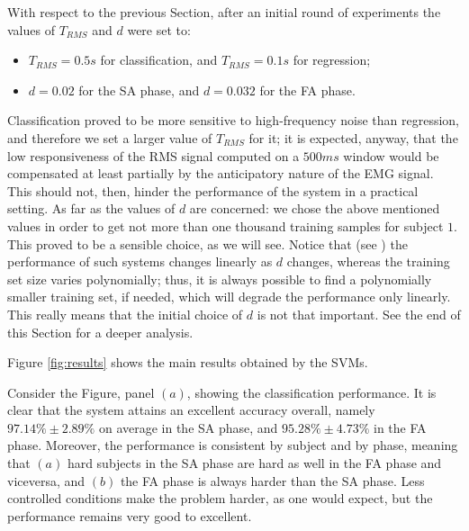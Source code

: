 \documentclass[10pt]{bmc_article}
\def\texttt{[image: ]}
\newenvironment{bmcformat}{\begin{raggedright}\baselineskip20pt\sloppy\setboolean{publ}{false}}{\end{raggedright}\baselineskip20pt\sloppy}
\begin{document}
\begin{bmcformat}
With respect to the previous Section, after an initial round of
experiments the values of $T_{RMS}$ and $d$ were set to:

\begin{itemize}

  \item $T_{RMS}=0.5s$ for classification, and $T_{RMS}=0.1s$ for regression;

  \item $d=0.02$ for the SA phase, and $d=0.032$ for the FA phase.

\end{itemize}

Classification proved to be more sensitive to high-frequency noise
than regression, and therefore we set a larger value of $T_{RMS}$ for
it; it is expected, anyway, that the low responsiveness of the RMS
signal computed on a $500ms$ window would be compensated at least
partially by the anticipatory nature of the EMG signal. This should
not, then, hinder the performance of the system in a practical
setting. As far as the values of $d$ are concerned: we chose the above
mentioned values in order to get not more than one thousand training
samples for subject $1$.  This proved to be a sensible choice, as we
will see. Notice that (see \cite{2008.BioCyb}) the performance of such
systems changes linearly as $d$ changes, whereas the training set size
varies polynomially; thus, it is always possible to find a
polynomially smaller training set, if needed, which will degrade the
performance only linearly. This really means that the initial choice
of $d$ is not that important. See the end of this Section for a deeper
analysis.

Figure \ref{fig:results} shows the main results obtained by the SVMs.


Consider the Figure, panel $(a)$, showing the classification
performance. It is clear that the system attains an excellent accuracy
overall, namely $97.14\% \pm 2.89\%$ on average in the SA phase, and
$95.28\% \pm 4.73\%$ in the FA phase. Moreover, the performance is
consistent by subject and by phase, meaning that $(a)$ hard subjects
in the SA phase are hard as well in the FA phase and viceversa, and
$(b)$ the FA phase is always harder than the SA phase. Less controlled
conditions make the problem harder, as one would expect, but the
performance remains very good to excellent.


\end{bmcformat}
\end{document}
